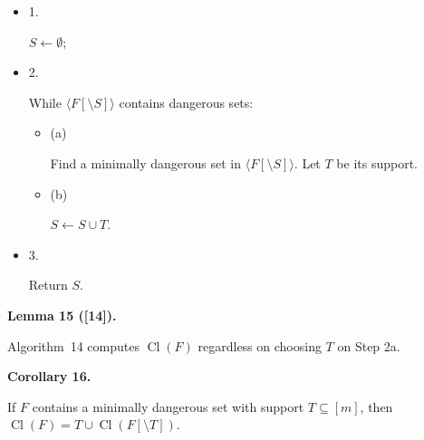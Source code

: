 \begin{itemize}


\item 
1. 


$S\leftarrow\emptyset$;\par





\item 
2. 


While $\langle F[\setminus S]\rangle$ contains dangerous sets:\par


\begin{itemize}


\item 
(a) 


Find a minimally dangerous set in $\langle F[\setminus S]\rangle$. Let $T$ be its support.\par





\item 
(b) 


$S\leftarrow S\cup T$.\par





\end{itemize}





\item 
3. 


Return $S$.\par





\end{itemize}




\par\medskip\noindent\textbf{
Lemma 15 ([14]).
}\par



Algorithm 14 computes $\mathop{\mathrm{Cl}}(F)$ regardless on choosing $T$ on Step 2a.\par




\par\medskip\noindent\textbf{
Corollary 16.
}\par



If $F$ contains a minimally dangerous set with support $T\subseteq[m]$, then $\mathop{\mathrm{Cl}}(F)=T\cup\mathop{\mathrm{Cl}}(F[\setminus T])$.\par




